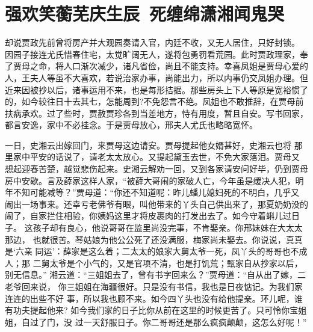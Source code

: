 \chapter{强欢笑蘅芜庆生辰~死缠绵潇湘闻鬼哭}

却说贾政先前曾将房产并大观园奏请入官，内廷不收，又无人居住，只好封锁。
因园子接连尤氏惜春住宅，太觉旷阔无人，遂将包勇罚看荒园。此时贾政理家，奉
了贾母之命，将人口渐次减少，诸凡省俭，尚且不能支持。幸喜凤姐是贾母心爱的
人，王夫人等虽不大喜欢，若说治家办事，尚能出力，所以内事仍交凤姐办理。但
近来因被抄以后，诸事运用不来，也是每形拮据。那些房头上下人等原是宽裕惯了
的，如今较往日十去其七，怎能周到?不免怨言不绝。凤姐也不敢推辞，在贾母前
扶病承欢。过了些时，贾赦贾珍各到当差地方，恃有用度，暂且自安。写书回家，
都言安逸，家中不必挂念。于是贾母放心，邢夫人尤氏也略略宽怀。

一日，史湘云出嫁回门，来贾母这边请安。贾母提起他女婿甚好，史湘云也将
那里家中平安的话说了，请老太太放心。又提起黛玉去世，不免大家落泪。贾母又
想起迎春苦楚，越觉悲伤起来。史湘云解劝一回，又到各家请安问好毕，仍到贾母
房中安歇。言及薛家这样人家，“被薛大哥闹的家破人亡，今年虽是缓决人犯，明
年不知可能减等？”贾母道：“你还不知道呢：昨儿蟠儿媳妇死的不明白，几乎又
闹出一场事来。还幸亏老佛爷有眼，叫他带来的丫头自己供出来了，那夏奶奶没的
闹了，自家拦住相验，你姨妈这里才将皮裹肉的打发出去了。如今守着蝌儿过日子。
这孩子却有良心，他说哥哥在监里尚没完事，不肯娶亲。你邢妹妹在大太太那边，
也就很苦。琴姑娘为他公公死了还没满服，梅家尚未娶去。你说说，真真是‘六亲
同运’：薛家是这么着；二太太的娘家大舅太爷一死，凤丫头的哥哥也不成人；那
二舅太爷是个小气的，又是官项不清，也是打饥荒；甄家自从抄家以后，别无信息。”
湘云道：“三姐姐去了，曾有书字回来么？”贾母道：“自从出了嫁，二老爷回来说，
你三姐姐在海疆很好。只是没有书信，我也是日夜惦记。为我们家连连的出些不好
事，所以我也顾不来。如今四丫头也没有给他提亲。环儿呢，谁有功夫提起他来?
如今我们家的日子比你从前在这里的时候更苦了。只可怜你宝姐姐，自过了门，没
过一天舒服日子。你二哥哥还是那么疯疯颠颠，这怎么好呢！”


